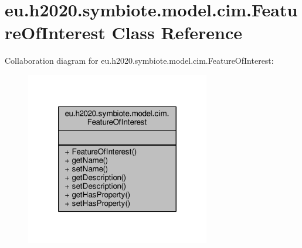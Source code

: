 \hypertarget{classeu_1_1h2020_1_1symbiote_1_1model_1_1cim_1_1FeatureOfInterest}{}\section{eu.\+h2020.\+symbiote.\+model.\+cim.\+Feature\+Of\+Interest Class Reference}
\label{classeu_1_1h2020_1_1symbiote_1_1model_1_1cim_1_1FeatureOfInterest}


Collaboration diagram for eu.\+h2020.\+symbiote.\+model.\+cim.\+Feature\+Of\+Interest\+:
\nopagebreak
\begin{figure}[H]
\begin{center}
\leavevmode
\includegraphics[width=228pt]{classeu_1_1h2020_1_1symbiote_1_1model_1_1cim_1_1FeatureOfInterest__coll__graph}
\end{center}
\end{figure}

